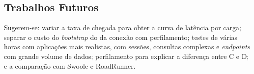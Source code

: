 \subsection{Trabalhos Futuros}
Sugerem-se: variar a taxa de chegada para obter a curva de latência por carga; separar o custo do \textit{bootstrap} do da conexão com perfilamento; testes de várias horas com aplicações mais realistas, com sessões, consultas complexas e \textit{endpoints} com grande volume de dados; perfilamento para explicar a diferença entre C e D; e a comparação com Swoole e RoadRunner.
